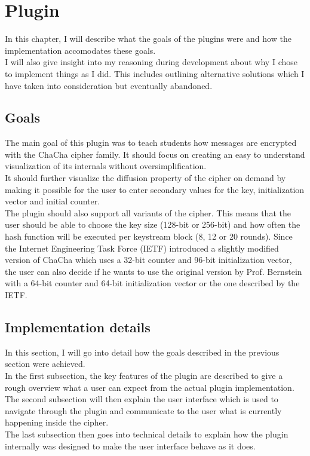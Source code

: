 %

\chapter{Plugin}
\label{chap:Plugin}

In this chapter, I will describe what the goals of the plugins were and how the implementation accomodates these goals.\\
I will also give insight into my reasoning during development about why I chose to implement things as I did. This includes outlining alternative solutions which I have taken into consideration but eventually abandoned.

\section{Goals}
\label{sec:goals}

The main goal of this plugin was to teach students how messages are encrypted with the ChaCha cipher family. It should focus on creating an easy to understand visualization of its internals without oversimplification. \\
It should further visualize the diffusion property of the cipher on demand by making it possible for the user to enter secondary values for the key, initialization vector and initial counter.\\
The plugin should also support all variants of the cipher. This means that the user should be able to choose the key size (128-bit or 256-bit) and how often the hash function will be executed per keystream block (8, 12 or 20 rounds). 
Since the Internet Engineering Task Force (IETF) introduced a slightly modified version of ChaCha which uses a 32-bit counter and 96-bit initialization vector, the user can also decide if he wants to use the original version by Prof. Bernstein with a 64-bit counter and 64-bit initialization vector or the one described by the IETF.

\section{Implementation details}
\label{sec:implementationDetails}

In this section, I will go into detail how the goals described in the previous section were achieved. \\
In the first subsection, the key features of the plugin are described to give a rough overview what a user can expect from the actual plugin implementation. \\
The second subsection will then explain the user interface which is used to navigate through the plugin and communicate to the user what is currently happening inside the cipher. \\
The last subsection then goes into technical details to explain how the plugin internally was designed to make the user interface behave as it does.


